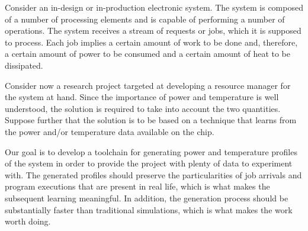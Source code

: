 Consider an in-design or in-production electronic system. The system is composed
of a number of processing elements and is capable of performing a number of
operations. The system receives a stream of requests or jobs, which it is
supposed to process. Each job implies a certain amount of work to be done and,
therefore, a certain amount of power to be consumed and a certain amount of heat
to be dissipated.

Consider now a research project targeted at developing a resource manager for
the system at hand. Since the importance of power and temperature is well
understood, the solution is required to take into account the two quantities.
Suppose further that the solution is to be based on a technique that learns from
the power and/or temperature data available on the chip.

Our goal is to develop a toolchain for generating power and temperature profiles
of the system in order to provide the project with plenty of data to experiment
with. The generated profiles should preserve the particularities of job arrivals
and program executions that are present in real life, which is what makes the
subsequent learning meaningful. In addition, the generation process should be
substantially faster than traditional simulations, which is what makes the work
worth doing.
